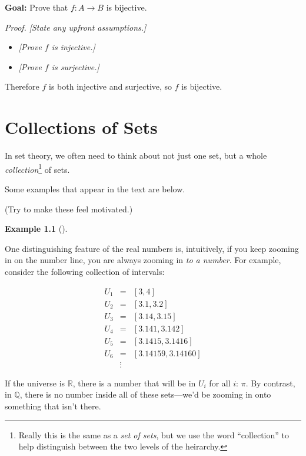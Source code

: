 \documentclass[
  letterpaper,
  DIV=11,
  numbers=noendperiod]{scrreprt}
\providecommand{\tightlist}{%
  \setlength{\itemsep}{0pt}\setlength{\parskip}{0pt}}
\def\R{\mathbb R}
\def\Q{\mathbb Q}
\theoremstyle{plain}
\theoremstyle{definition}
\theoremstyle{plain}
\theoremstyle{plain}
\theoremstyle{definition}
\newtheorem{example}{Example}[chapter]
\theoremstyle{definition}
\theoremstyle{remark}
\begin{document}
\begin{tcolorbox}[enhanced jigsaw, titlerule=0mm, opacitybacktitle=0.6, leftrule=.75mm, bottomrule=.15mm, left=2mm, arc=.35mm, colback=white, rightrule=.15mm, colframe=quarto-callout-note-color-frame, toptitle=1mm, breakable, opacityback=0, colbacktitle=quarto-callout-note-color!10!white, bottomtitle=1mm, title=\textcolor{quarto-callout-note-color}{\faInfo}\hspace{0.5em}{Bijectivity}, coltitle=black, toprule=.15mm]

\textbf{Goal:} Prove that \(f:A\rightarrow B\) is bijective.

\emph{Proof.} \emph{{[}State any upfront assumptions.{]}}

\begin{itemize}
\tightlist
\item
  \emph{{[}Prove \(f\) is injective.{]}}
\item
  \emph{{[}Prove \(f\) is surjective.{]}}
\end{itemize}

Therefore \(f\) is both injective and surjective, so \(f\) is bijective.

\end{tcolorbox}

\chapter{Collections of Sets}\label{collections-of-sets}

In set theory, we often need to think about not just one set, but a
whole \emph{collection}\footnote{Really this is the same as a \emph{set
  of sets}, but we use the word ``collection'' to help distinguish
  between the two levels of the heirarchy.} of sets.

Some examples that appear in the text are below.

(Try to make these feel motivated.)

\begin{example}[]\protect\hypertarget{exm-nit-collection}{}\label{exm-nit-collection}

One distinguishing feature of the real numbers is, intuitively, if you
keep zooming in on the number line, you are always zooming in \emph{to a
number}. For example, consider the following collection of intervals:

\[\begin{aligned}
  U_1&=&[3,4]\\ 
  U_2&=&[3.1,3.2]\\ 
  U_3&=&[3.14,3.15]\\ 
  U_4&=&[3.141,3.142]\\ 
  U_5&=&[3.1415,3.1416]\\
  U_6&=&[3.14159,3.14160]\\
  &\vdots&
\end{aligned}\]

If the universe is \(\R\), there is a number that will be in \(U_i\) for
all \(i\): \(\pi\). By contrast, in \(\Q\), there is no number inside
all of these sets---we'd be zooming in onto something that isn't there.

\end{example}
\end{document}
